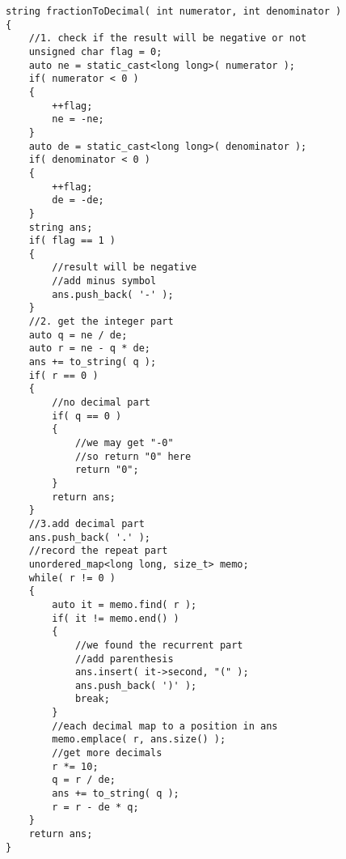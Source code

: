 \setcounter{lstlisting}{0}
\begin{lstlisting}[style=customc, caption={Mathematical}]
string fractionToDecimal( int numerator, int denominator )
{
    //1. check if the result will be negative or not
    unsigned char flag = 0;
    auto ne = static_cast<long long>( numerator );
    if( numerator < 0 )
    {
        ++flag;
        ne = -ne;
    }
    auto de = static_cast<long long>( denominator );
    if( denominator < 0 )
    {
        ++flag;
        de = -de;
    }
    string ans;
    if( flag == 1 )
    {
        //result will be negative
        //add minus symbol
        ans.push_back( '-' );
    }
    //2. get the integer part
    auto q = ne / de;
    auto r = ne - q * de;
    ans += to_string( q );
    if( r == 0 )
    {
        //no decimal part
        if( q == 0 )
        {
            //we may get "-0"
            //so return "0" here
            return "0";
        }
        return ans;
    }
    //3.add decimal part
    ans.push_back( '.' );
    //record the repeat part
    unordered_map<long long, size_t> memo;
    while( r != 0 )
    {
        auto it = memo.find( r );
        if( it != memo.end() )
        {
            //we found the recurrent part
            //add parenthesis
            ans.insert( it->second, "(" );
            ans.push_back( ')' );
            break;
        }
        //each decimal map to a position in ans
        memo.emplace( r, ans.size() );
        //get more decimals
        r *= 10;
        q = r / de;
        ans += to_string( q );
        r = r - de * q;
    }
    return ans;
}
\end{lstlisting}